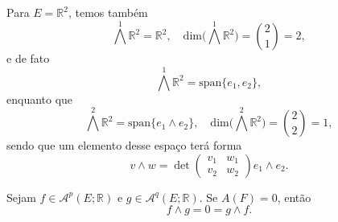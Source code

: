 \documentclass[../differential_forms.tex]{subfiles}
\begin{document}
\begin{example}
	Para \(E=\mathbb{R}^{2}\), temos também
	\[
		\bigwedge^{1}\mathbb{R}^{2} = \mathbb{R}^{2},\quad \mathrm{dim}\biggl(\bigwedge^{1}\mathbb{R}^{2} \biggr) = \binom{2}{1} = 2,
	\]
	e de fato
	\[
		\bigwedge^{1}\mathbb{R}^{2} = \mathrm{span}\{e_1, e_2\},
	\]
	enquanto que
	\[
		\bigwedge^{2}\mathbb{R}^{2} = \mathrm{span}\{e_1\wedge e_2\}, \quad \mathrm{dim}\biggl(\bigwedge^{2}\mathbb{R}^{2}\biggr) = \binom{2}{2}=1,
	\]
	sendo que um elemento desse espaço terá forma
	\[
		v\wedge w = \det{\begin{pmatrix}
				v_1 & w_1 \\
				v_2 & w_2
			\end{pmatrix}} e_1 \wedge e_2.
	\]
\end{example}

\begin{lemma*}
	Sejam \(f\in \mathcal{A}^{p}(E; \mathbb{R})\) e \(g\in \mathcal{A}^{q}(E; \mathbb{R})\). Se \(A(F) = 0 \), então
	\[
		f \wedge g = 0 = g \wedge f.
	\]
\end{lemma*}
\end{document}
